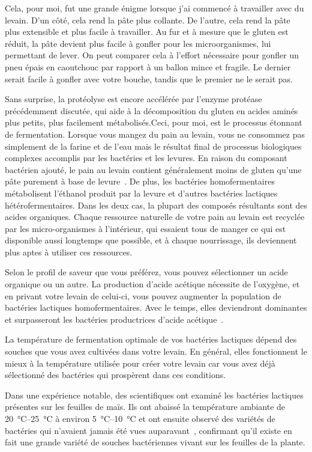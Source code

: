Cela, pour moi, fut une grande énigme lorsque j'ai commencé à travailler avec du levain.
D'un côté, cela rend la pâte plus collante. De l'autre, cela rend la pâte
plus extensible et plus facile à travailler. Au fur et à mesure que le gluten est réduit, la pâte
devient plus facile à gonfler pour les microorganismes, lui permettant de lever. On peut comparer cela à l'effort nécessaire pour gonfler un pneu épais en caoutchouc
par rapport à un ballon mince et fragile. Le dernier serait facile à gonfler avec
votre bouche, tandis que le premier ne le serait pas.

Sans surprise, la protéolyse est encore accélérée par l'enzyme protéase
précédemment discutée, qui aide à la décomposition du gluten en acides aminés plus petits,
plus facilement métabolisés.Ceci, pour moi, est le processus étonnant de fermentation. Lorsque vous mangez du pain au levain, vous ne consommez pas simplement de la farine et de l'eau mais le résultat final de processus biologiques complexes accomplis par les bactéries et les levures. En raison du composant bactérien ajouté, le pain au levain contient généralement moins de gluten qu'une pâte purement à base de levure~\cite{proteolysis+sourdough+bacteria}. De plus, les bactéries homofermentaires métabolisent l'éthanol produit par la levure et d'autres bactéries lactiques hétérofermentaires. Dans les deux cas, la plupart des composés résultants sont des acides organiques. Chaque ressource naturelle de votre pain au levain est recyclée par les micro-organismes à l'intérieur, qui essaient tous de manger ce qui est disponible aussi longtemps que possible, et à chaque nourrissage, ils deviennent plus aptes à utiliser ces ressources.

Selon le profil de saveur que vous préférez, vous pouvez sélectionner un acide organique ou un autre. La production d'acide acétique nécessite de l'oxygène, et en privant votre levain de celui-ci, vous pouvez augmenter la population de bactéries lactiques homofermentaires. Avec le temps, elles deviendront dominantes et surpasseront les bactéries productrices d'acide acétique~\cite{acetic+acid+oxygen}.

La température de fermentation optimale de vos bactéries lactiques dépend des souches que vous avez cultivées dans votre levain. En général, elles fonctionnent le mieux à la température utilisée pour créer votre levain car vous avez déjà sélectionné des bactéries qui prospèrent dans ces conditions.

Dans une expérience notable, des scientifiques ont examiné les bactéries lactiques présentes sur les feuilles de maïs. Ils ont abaissé la température ambiante de \qtyrange{20}{25}{\degreeCelsius} à environ \qtyrange{5}{10}{\degreeCelsius} et ont ensuite observé des variétés de bactéries qui n'avaient jamais été vues auparavant~\cite{temperature+bacteria+corn}, confirmant qu'il existe en fait une grande variété de souches bactériennes vivant sur les feuilles de la plante.

